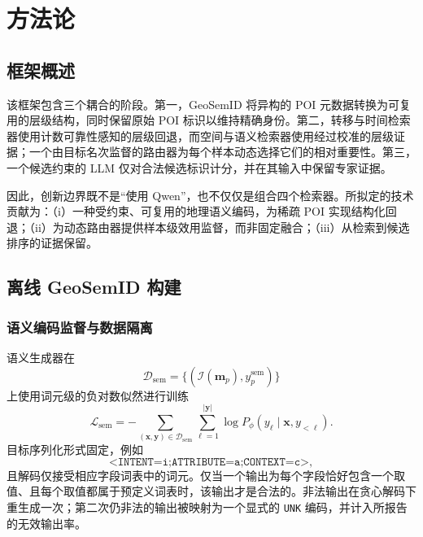 \documentclass[10pt,fontset=none,twocolumn]{ctexart}
\begin{document}
\section{方法论}
\label{sec:method}

\subsection{框架概述}

该框架包含三个耦合的阶段。第一，GeoSemID 将异构的 POI 元数据转换为可复用的层级结构，同时保留原始 POI 标识以维持精确身份。第二，转移与时间检索器使用计数可靠性感知的层级回退，而空间与语义检索器使用经过校准的层级证据；一个由目标名次监督的路由器为每个样本动态选择它们的相对重要性。第三，一个候选约束的 LLM 仅对合法候选标识计分，并在其输入中保留专家证据。

因此，创新边界既不是“使用 Qwen”，也不仅仅是组合四个检索器。所拟定的技术贡献为：（i）一种受约束、可复用的地理语义编码，为稀疏 POI 实现结构化回退；（ii）为动态路由器提供样本级效用监督，而非固定融合；（iii）从检索到候选排序的证据保留。

\subsection{离线 GeoSemID 构建}
\label{subsec:geosemid}

\subsubsection{语义编码监督与数据隔离}

语义生成器在
\begin{equation}
\mathcal{D}_{\mathrm{sem}}
=
\{
(\mathcal{I}(\bm{m}_p),y_p^{\mathrm{sem}})
\}
\label{eq:semantic_dataset}
\end{equation}
上使用词元级的负对数似然进行训练
\begin{equation}
\mathcal{L}_{\mathrm{sem}}
=
-
\sum_{(\bm{x},\bm{y})\in\mathcal{D}_{\mathrm{sem}}}
\sum_{\ell=1}^{|\bm{y}|}
\log P_{\phi}(y_{\ell}\mid\bm{x},y_{<\ell}).
\label{eq:semantic_loss}
\end{equation}
目标序列化形式固定，例如
\begin{equation}
\texttt{<INTENT=i;ATTRIBUTE=a;CONTEXT=c>},
\label{eq:serialization_example}
\end{equation}
且解码仅接受相应字段词表中的词元。仅当一个输出为每个字段恰好包含一个取值、且每个取值都属于预定义词表时，该输出才是合法的。非法输出在贪心解码下重生成一次；第二次仍非法的输出被映射为一个显式的 \texttt{UNK} 编码，并计入所报告的无效输出率。
\end{document}

